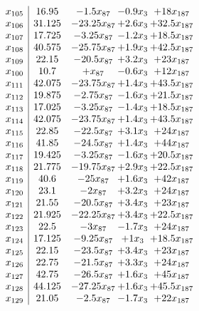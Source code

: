 \documentclass[11pt]{article}
\begin{document}
\[\begin{array}{c| c c@{\hskip 2pt} c@{\hskip 2pt} c@{\hskip 2pt} }
 x_{105}   &  16.95 & -1.5 x_{87} & -0.9 x_{3} & + 18 x_{187}\\
 x_{106}   &  31.125 & -23.25 x_{87} & + 2.6 x_{3} & + 32.5 x_{187}\\
 x_{107}   &  17.725 & -3.25 x_{87} & -1.2 x_{3} & + 18.5 x_{187}\\
 x_{108}   &  40.575 & -25.75 x_{87} & + 1.9 x_{3} & + 42.5 x_{187}\\
 x_{109}   &  22.15 & -20.5 x_{87} & + 3.2 x_{3} & + 23 x_{187}\\
 x_{100}   &  10.7 & +  x_{87} & -0.6 x_{3} & + 12 x_{187}\\
 x_{111}   &  42.075 & -23.75 x_{87} & + 1.4 x_{3} & + 43.5 x_{187}\\
 x_{112}   &  19.875 & -2.75 x_{87} & -1.6 x_{3} & + 21.5 x_{187}\\
 x_{113}   &  17.025 & -3.25 x_{87} & -1.4 x_{3} & + 18.5 x_{187}\\
 x_{114}   &  42.075 & -23.75 x_{87} & + 1.4 x_{3} & + 43.5 x_{187}\\
 x_{115}   &  22.85 & -22.5 x_{87} & + 3.1 x_{3} & + 24 x_{187}\\
 x_{116}   &  41.85 & -24.5 x_{87} & + 1.4 x_{3} & + 44 x_{187}\\
 x_{117}   &  19.425 & -3.25 x_{87} & -1.6 x_{3} & + 20.5 x_{187}\\
 x_{118}   &  21.775 & -19.75 x_{87} & + 2.9 x_{3} & + 22.5 x_{187}\\
 x_{119}   &  40.6 & -25 x_{87} & + 1.6 x_{3} & + 42 x_{187}\\
 x_{120}   &  23.1 & -2 x_{87} & + 3.2 x_{3} & + 24 x_{187}\\
 x_{121}   &  21.55 & -20.5 x_{87} & + 3.4 x_{3} & + 23 x_{187}\\
 x_{122}   &  21.925 & -22.25 x_{87} & + 3.4 x_{3} & + 22.5 x_{187}\\
 x_{123}   &  22.5 & -3 x_{87} & -1.7 x_{3} & + 24 x_{187}\\
 x_{124}   &  17.125 & -9.25 x_{87} & + 1 x_{3} & + 18.5 x_{187}\\
 x_{125}   &  22.15 & -23.5 x_{87} & + 3.4 x_{3} & + 23 x_{187}\\
 x_{126}   &  22.75 & -21.5 x_{87} & + 3.3 x_{3} & + 24 x_{187}\\
 x_{127}   &  42.75 & -26.5 x_{87} & + 1.6 x_{3} & + 45 x_{187}\\
 x_{128}   &  44.125 & -27.25 x_{87} & + 1.6 x_{3} & + 45.5 x_{187}\\
 x_{129}   &  21.05 & -2.5 x_{87} & -1.7 x_{3} & + 22 x_{187}\\

\end{array}\]
\end{document}

